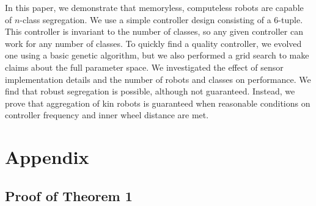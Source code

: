 \documentclass[conference]{IEEEtran}
\begin{document}
  In this paper, we demonstrate that memoryless, computeless robots are capable of $n$-class segregation. We use a simple controller design consisting of a 6-tuple. This controller is invariant to the number of classes, so any given controller can work for any number of classes. To quickly find a quality controller, we evolved one using a basic genetic algorithm, but we also performed a grid search to make claims about the full parameter space. We investigated the effect of sensor implementation details and the number of robots and classes on performance. We find that robust segregation is possible, although not guaranteed. Instead, we prove that aggregation of kin robots is guaranteed when reasonable conditions on controller frequency and inner wheel distance are met.




\onecolumn
\appendix
\section{Appendix}

  \subsection{Proof of Theorem 1} \label{thm:1}
\end{document}
